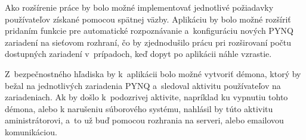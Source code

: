 Ako rozšírenie práce by bolo možné implementovať jednotlivé požiadavky používateľov získané pomocou spätnej väzby. Aplikáciu by bolo možné rozšíriť pridaním funkcie pre automatické rozpoznávanie a~konfiguráciu nových PYNQ zariadení na sieťovom rozhraní, čo by zjednodušilo prácu pri rozširovaní počtu dostupných zariadení v~prípadoch, keď dopyt po aplikácii náhle vzrastie.

Z~bezpečnostného hľadiska by k~aplikácii bolo možné vytvoriť démona, ktorý by bežal na jednotlivých zariadenia PYNQ a~sledoval aktivitu používateľov na zariadeniach. Ak by došlo k~podozrivej aktivite, napríklad ku vypnutiu tohto démona, alebo k narušeniu súborového systému, nahlásil by túto aktivitu aministrátorovi, a~to už buď pomocou rozhrania na serveri, alebo emailovou komunikáciou.  
